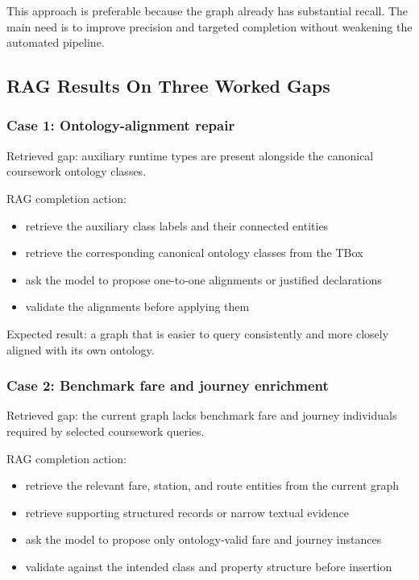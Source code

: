 \documentclass[
  11pt,
  a4paper,
]{article}
\providecommand{\tightlist}{%
  \setlength{\itemsep}{0pt}\setlength{\parskip}{0pt}}
\begin{document}
This approach is preferable because the graph already has substantial
recall. The main need is to improve precision and targeted completion
without weakening the automated pipeline.

\subsection{RAG Results On Three Worked
Gaps}\label{rag-results-on-three-worked-gaps}

\subsubsection{Case 1: Ontology-alignment
repair}\label{case-1-ontology-alignment-repair}

Retrieved gap: auxiliary runtime types are present alongside the
canonical coursework ontology classes.

RAG completion action:

\begin{itemize}
\tightlist
\item
  retrieve the auxiliary class labels and their connected entities
\item
  retrieve the corresponding canonical ontology classes from the TBox
\item
  ask the model to propose one-to-one alignments or justified
  declarations
\item
  validate the alignments before applying them
\end{itemize}

Expected result: a graph that is easier to query consistently and more
closely aligned with its own ontology.

\subsubsection{Case 2: Benchmark fare and journey
enrichment}\label{case-2-benchmark-fare-and-journey-enrichment}

Retrieved gap: the current graph lacks benchmark fare and journey
individuals required by selected coursework queries.

RAG completion action:

\begin{itemize}
\tightlist
\item
  retrieve the relevant fare, station, and route entities from the
  current graph
\item
  retrieve supporting structured records or narrow textual evidence
\item
  ask the model to propose only ontology-valid fare and journey
  instances
\item
  validate against the intended class and property structure before
  insertion
\end{itemize}
\end{document}
